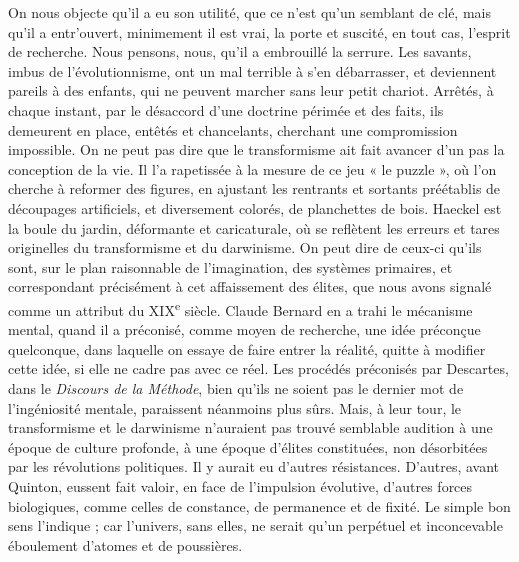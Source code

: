 \documentclass[french,twoside]{book} %
\begin{document}
On nous objecte qu’il a eu son utilité, que ce n’est qu’un semblant de clé, mais qu’il a entr’ouvert, minimement il est vrai, la porte et suscité, en tout cas, l’esprit de recherche. Nous pensons, nous, qu’il a embrouillé la serrure. Les savants, imbus de l’évolutionnisme, ont un mal terrible à s’en débarrasser, et deviennent pareils à des enfants, qui ne peuvent marcher sans leur petit chariot. Arrêtés, à chaque instant, par le désaccord d’une doctrine périmée et des faits, ils demeurent en place, entêtés et chancelants, cherchant une compromission impossible. On ne peut pas dire que le transformisme ait fait avancer d’un pas la conception de la vie. Il l’a rapetissée à la mesure de ce jeu « le puzzle », où l’on cherche à reformer des figures, en ajustant les rentrants et sortants préétablis de découpages artificiels, et diversement colorés, de planchettes de bois. Haeckel est la boule du jardin, déformante et caricaturale, où se reflètent les erreurs et tares originelles du transformisme et du darwinisme. On peut dire de ceux-ci qu’ils sont, sur le plan raisonnable de l’imagination, des systèmes primaires, et correspondant précisément à cet affaissement des élites, que nous avons signalé comme un attribut du XIX\textsuperscript{e} siècle. Claude Bernard en a trahi le mécanisme mental, quand il a préconisé, comme moyen de recherche, une idée préconçue quelconque, dans laquelle on essaye de faire entrer la réalité, quitte à modifier cette idée, si elle ne cadre pas avec ce réel. Les procédés préconisés par Descartes, dans le {\itshape Discours de la Méthode}, bien qu’ils ne soient pas le dernier mot de l’ingéniosité mentale, paraissent néanmoins plus sûrs. Mais, à leur tour, le transformisme et le darwinisme n’auraient pas trouvé semblable audition à une époque de culture profonde, à une époque d’élites constituées, non désorbitées par les révolutions politiques. Il y aurait eu d’autres résistances. D’autres, avant Quinton, eussent fait valoir, en face de l’impulsion évolutive, d’autres forces biologiques, comme celles de constance, de permanence et de fixité. Le simple bon sens l’indique ; car l’univers, sans elles, ne serait qu’un perpétuel et inconcevable éboulement d’atomes et de poussières.\par
\end{document}
